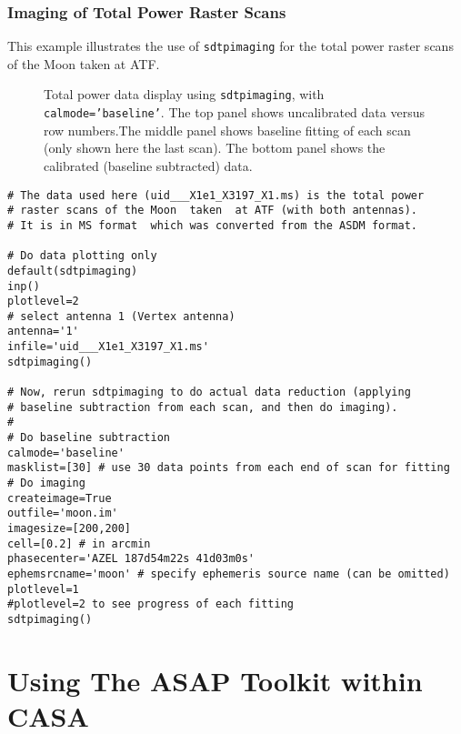 \subsubsection{Imaging of Total Power Raster Scans}
This example illustrates the use of {\tt sdtpimaging} for the total
power raster scans of the Moon taken at ATF.
\begin{figure}[h!]
\begin{center}
\caption{\label{fig:sdtpimaging} Total power data display using {\tt sdtpimaging}, 
with {\tt calmode='baseline'}. The top  panel shows uncalibrated data versus row numbers.The middle panel shows baseline fitting of each scan (only shown here the last
scan). The bottom panel shows the calibrated (baseline subtracted) data. }
\hrulefill
\end{center}
\end{figure}

\begin{verbatim}
# The data used here (uid___X1e1_X3197_X1.ms) is the total power 
# raster scans of the Moon  taken  at ATF (with both antennas). 
# It is in MS format  which was converted from the ASDM format.

# Do data plotting only
default(sdtpimaging)
inp()
plotlevel=2
# select antenna 1 (Vertex antenna) 
antenna='1'
infile='uid___X1e1_X3197_X1.ms'
sdtpimaging()

# Now, rerun sdtpimaging to do actual data reduction (applying
# baseline subtraction from each scan, and then do imaging).
#
# Do baseline subtraction 
calmode='baseline'
masklist=[30] # use 30 data points from each end of scan for fitting
# Do imaging 
createimage=True
outfile='moon.im'
imagesize=[200,200]
cell=[0.2] # in arcmin
phasecenter='AZEL 187d54m22s 41d03m0s'  
ephemsrcname='moon' # specify ephemeris source name (can be omitted)
plotlevel=1
#plotlevel=2 to see progress of each fitting
sdtpimaging()
\end{verbatim}



\section{Using The ASAP Toolkit within CASA}
\label{section:sd.asap}


